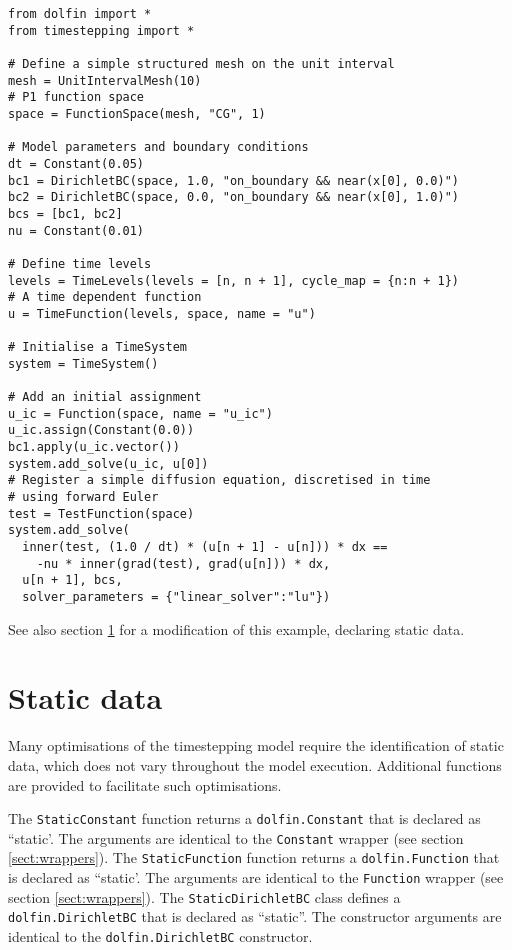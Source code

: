 \documentclass[a4paper]{book}
\begin{document}
\begin{lstlisting}
from dolfin import *
from timestepping import *

# Define a simple structured mesh on the unit interval
mesh = UnitIntervalMesh(10)
# P1 function space
space = FunctionSpace(mesh, "CG", 1)

# Model parameters and boundary conditions
dt = Constant(0.05)
bc1 = DirichletBC(space, 1.0, "on_boundary && near(x[0], 0.0)")
bc2 = DirichletBC(space, 0.0, "on_boundary && near(x[0], 1.0)")
bcs = [bc1, bc2]
nu = Constant(0.01)

# Define time levels
levels = TimeLevels(levels = [n, n + 1], cycle_map = {n:n + 1})
# A time dependent function
u = TimeFunction(levels, space, name = "u")

# Initialise a TimeSystem
system = TimeSystem()

# Add an initial assignment
u_ic = Function(space, name = "u_ic")
u_ic.assign(Constant(0.0))
bc1.apply(u_ic.vector())
system.add_solve(u_ic, u[0])
# Register a simple diffusion equation, discretised in time
# using forward Euler
test = TestFunction(space)
system.add_solve(
  inner(test, (1.0 / dt) * (u[n + 1] - u[n])) * dx ==
    -nu * inner(grad(test), grad(u[n])) * dx,
  u[n + 1], bcs,
  solver_parameters = {"linear_solver":"lu"})
\end{lstlisting}
See also section \ref{sect:statics} for a modification of this example,
declaring static data.

\section{Static data}\label{sect:statics}

Many optimisations of the timestepping model require the identification of
static data, which does not vary throughout the model execution. Additional
functions are provided to facilitate such optimisations.

The \verb+StaticConstant+ function returns a \verb+dolfin.Constant+ that is
declared as ``static'. The arguments are identical to the \verb+Constant+
wrapper (see section \ref{sect:wrappers}). The \verb+StaticFunction+ function
returns a \verb+dolfin.Function+ that is declared as ``static'. The arguments
are identical to the \verb+Function+ wrapper (see section
\ref{sect:wrappers}). The \verb+StaticDirichletBC+ class defines a
\verb+dolfin.DirichletBC+ that is declared as ``static''. The constructor
arguments are identical to the \verb+dolfin.DirichletBC+ constructor.
\end{document}
